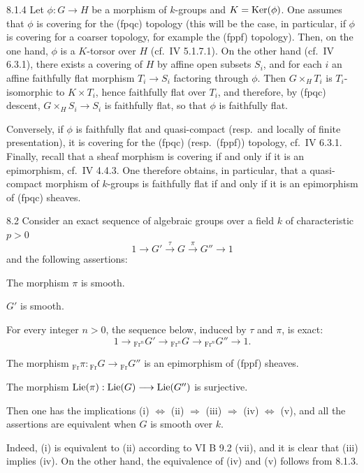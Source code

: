 \begin{remark}{8.1.4}\label{VIIA.8.1.4}
Let $\phi:G\to H$ be a morphism of $k$-groups and $K=\operatorname{Ker}(\phi)$. One assumes that $\phi$ is covering for the (fpqc) topology (this will be the case, in particular, if $\phi$ is covering for a coarser topology, for example the (fppf) topology). Then, on the one hand, $\phi$ is a $K$-torsor over $H$ (cf.\ IV 5.1.7.1). On the other hand (cf.\ IV 6.3.1), there exists a covering of $H$ by affine open subsets $S_i$, and for each $i$ an affine faithfully flat morphism $T_i\to S_i$ factoring through $\phi$. Then $G\times_H T_i$ is $T_i$-isomorphic to $K\times T_i$, hence faithfully flat over $T_i$, and therefore, by (fpqc) descent, $G\times_H S_i\to S_i$ is faithfully flat, so that $\phi$ is faithfully flat.

Conversely, if $\phi$ is faithfully flat and quasi-compact (resp.\ and locally of finite presentation), it is covering for the (fpqc) (resp.\ (fppf)) topology, cf.\ IV 6.3.1. Finally, recall that a sheaf morphism is covering if and only if it is an epimorphism, cf.\ IV 4.4.3. One therefore obtains, in particular, that a quasi-compact morphism of $k$-groups is faithfully flat if and only if it is an epimorphism of (fpqc) sheaves.
\end{remark}

\begin{proposition}{8.2}\label{VIIA.8.2}
Consider an exact sequence of algebraic groups over a field $k$ of characteristic $p>0$
\[
1\longrightarrow G'\xrightarrow{\tau}G\xrightarrow{\pi}G''\longrightarrow1
\]
and the following assertions:
\begin{enumeratei}
\item The morphism $\pi$ is smooth.
\item $G'$ is smooth.
\item For every integer $n>0$, the sequence below, induced by $\tau$ and $\pi$, is exact:
\[
1\longrightarrow{}_{\mathrm{Fr}^n}G'\longrightarrow{}_{\mathrm{Fr}^n}G\longrightarrow{}_{\mathrm{Fr}^n}G''\longrightarrow1.
\]
\item The morphism ${}_{\mathrm{Fr}}\pi:{}_{\mathrm{Fr}}G\to{}_{\mathrm{Fr}}G''$ is an epimorphism of (fppf) sheaves.
\item The morphism $\operatorname{Lie}(\pi):\operatorname{Lie}(G)\longrightarrow\operatorname{Lie}(G'')$ is surjective.
\end{enumeratei}
Then one has the implications (i) $\Leftrightarrow$ (ii) $\Rightarrow$ (iii) $\Rightarrow$ (iv) $\Leftrightarrow$ (v), and all the assertions are equivalent when $G$ is smooth over $k$.
\end{proposition}
Indeed, (i) is equivalent to (ii) according to VI B 9.2 (vii), and it is clear that (iii) implies (iv). On the other hand, the equivalence of (iv) and (v) follows from 8.1.3.

